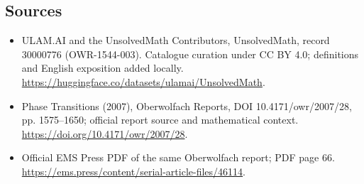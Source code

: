\documentclass[11pt]{article}
\begin{document}
\subsection{Sources}
\begin{itemize}
\item[\hypertarget{source:30000776:1}{S1}] ULAM.AI and the UnsolvedMath Contributors, UnsolvedMath, record 30000776 (OWR-1544-003). Catalogue curation under CC BY 4.0; definitions and English exposition added locally.
\url{https://huggingface.co/datasets/ulamai/UnsolvedMath}.
\item[\hypertarget{source:30000776:2}{S2}] Phase Transitions (2007), Oberwolfach Reports, DOI 10.4171/owr/2007/28, pp. 1575--1650; official report source and mathematical context.
\url{https://doi.org/10.4171/owr/2007/28}.
\item[\hypertarget{source:30000776:3}{S3}] Official EMS Press PDF of the same Oberwolfach report; PDF page 66.
\url{https://ems.press/content/serial-article-files/46114}.
\end{itemize}
\label{end:30000776}
\end{document}
